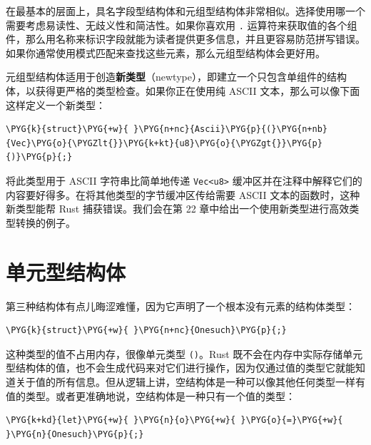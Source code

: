在最基本的层面上，具名字段型结构体和元组型结构体非常相似。选择使用哪一个需要考虑易读性、无歧义性和简洁性。如果你喜欢用 \texttt{.} 运算符来获取值的各个组件，那么用名称来标识字段就能为读者提供更多信息，并且更容易防范拼写错误。如果你通常使用模式匹配来查找这些元素，那么元组型结构体会更好用。

元组型结构体适用于创造\textbf{新类型}（newtype），即建立一个只包含单组件的结构体，以获得更严格的类型检查。如果你正在使用纯 ASCII 文本，那么可以像下面这样定义一个新类型：

\begin{Verbatim}[commandchars=\\\{\},breaklines=true,breakanywhere=true,fontsize=\codefont,xleftmargin=17bp]
\PYG{k}{struct}\PYG{+w}{ }\PYG{n+nc}{Ascii}\PYG{p}{(}\PYG{n+nb}{Vec}\PYG{o}{\PYGZlt{}}\PYG{k+kt}{u8}\PYG{o}{\PYGZgt{}}\PYG{p}{)}\PYG{p}{;}
\end{Verbatim}

将此类型用于 ASCII 字符串比简单地传递 \texttt{Vec<u8>} 缓冲区并在注释中解释它们的内容要好得多。在将其他类型的字节缓冲区传给需要 ASCII 文本的函数时，这种新类型能帮 Rust 捕获错误。我们会在第 22 章中给出一个使用新类型进行高效类型转换的例子。

\section{单元型结构体}

第三种结构体有点儿晦涩难懂，因为它声明了一个根本没有元素的结构体类型：

\begin{Verbatim}[commandchars=\\\{\},breaklines=true,breakanywhere=true,fontsize=\codefont,xleftmargin=17bp]
\PYG{k}{struct}\PYG{+w}{ }\PYG{n+nc}{Onesuch}\PYG{p}{;}
\end{Verbatim}

这种类型的值不占用内存，很像单元类型 \texttt{()}。Rust 既不会在内存中实际存储单元型结构体的值，也不会生成代码来对它们进行操作，因为仅通过值的类型它就能知道关于值的所有信息。但从逻辑上讲，空结构体是一种可以像其他任何类型一样有值的类型。或者更准确地说，空结构体是一种只有一个值的类型：

\begin{Verbatim}[commandchars=\\\{\},breaklines=true,breakanywhere=true,fontsize=\codefont,xleftmargin=17bp]
\PYG{k+kd}{let}\PYG{+w}{ }\PYG{n}{o}\PYG{+w}{ }\PYG{o}{=}\PYG{+w}{ }\PYG{n}{Onesuch}\PYG{p}{;}
\end{Verbatim}

